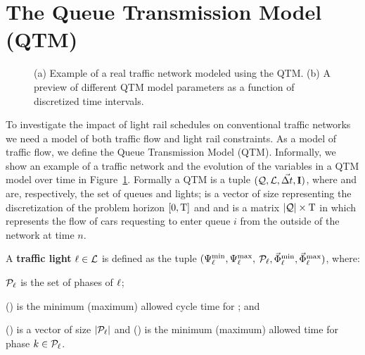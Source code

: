 \section{The Queue Transmission Model (QTM)}


\begin{figure}[t]
\centering
\caption{(a) Example of a real traffic network modeled using the
  QTM. (b) A preview of different QTM model parameters as a function
  of discretized time intervals.}
\label{fig:qtm}
%
\end{figure}



To investigate the impact of light rail schedules on conventional
traffic networks we need a model of both traffic flow and light rail
constraints.  As a model of traffic flow, we define the Queue
Transmission Model (QTM).  Informally, we show an example of a traffic
network and the evolution of the variables in a QTM model over time
in Figure~\ref{fig:qtm}.  Formally a QTM is a tuple $(\mathcal{Q}, \mathcal{L},
\vec{\Delta t}, \mathbf{I})$, where \Qset and \Lset are, respectively, the set of
queues and lights;
%
\vecDT is a vector of size \Nn representing the discretization of the problem
horizon $[0,\mathrm{T}]$ and 
%
%
and \MatQIN is a matrix $|\mathcal{Q}| \times \mathrm{T}$ in which  represents
the flow of cars requesting to enter queue $i$ from the outside of the network
at time $n$.



A \textbf{traffic light} $\ell \in \mathcal{L}$ is defined as the tuple $(\mathrm{\Psi}_{\ell}^{\mathrm{min}},
\mathrm{\Psi}_{\ell}^{\mathrm{max}},$ $\mathcal{P}_\ell, \vec{\mathrm{\Phi}}_{\ell}^{\mathrm{min}}, \vec{\mathrm{\Phi}}_{\ell}^{\mathrm{max}})$, where:
%
\begin{itemize*}[label={}]
%
\item $\mathcal{P}_\ell$ is the set of phases of $\ell$;
%
\item \CTMIN{\tl} (\CTMAX{\tl}) is the minimum (maximum) allowed cycle time for
\tl; and
%
\item \VecPTMIN{\tl} (\VecPTMAX{\tl}) is a vector of size $|\mathcal{P}_\ell|$ and
   () is the minimum (maximum) allowed time for
  phase $k \in \mathcal{P}_\ell$. 
%
\end{itemize*}


